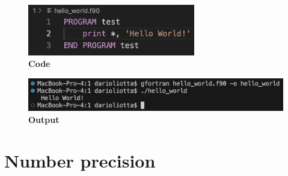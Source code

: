\documentclass[10pt,externalviewer]{beamer}
\begin{document}
\begin{frame}
\begin{minipage}{0.45\textwidth}
      \begin{figure}[H]
         \centering
         \includegraphics[width=0.65\textwidth]{Immagini/hello_world_code.png}
         \caption*{\scriptsize{\textbf{Code}}}
      \end{figure}

      \vspace{-0.6cm}

      \begin{figure}[H]
         \centering
         \includegraphics[width=\textwidth]{Immagini/hello_world_output.png}
         \caption*{\scriptsize{\textbf{Output}}}
      \end{figure}

   \end{minipage}
\end{frame}

\section{Number precision}
\end{document}
